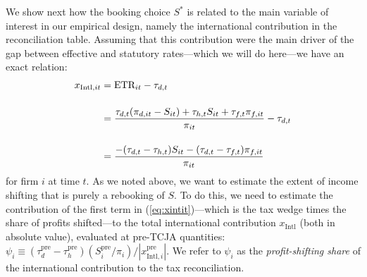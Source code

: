 \documentclass[11pt,letterpaper]{article}
\begin{document}
We show next how the booking choice $S^*$ is related to the main variable of 
interest in our empirical design, namely the international
contribution in the reconciliation table. Assuming 
that this contribution were the main driver of the
gap between effective and statutory rates---which we will do here---we have
an exact relation:
\begin{align}
  x_{\text{Intl},it} & =  \text{ETR}_{it}-\tau_{d,t}
  \nonumber\\
  \noalign{\bigskip}
                     & = \frac{\tau_{d,t}(\pi_{d,it}-S_{it})+\tau_{h,t}S_{it}+\tau_{f,t}\pi_{f,it}}{\pi_{it}}-\tau_{d,t}
  \nonumber \\
  \noalign{\bigskip}
                     & = \frac{-(\tau_{d,t}-\tau_{h,t})S_{it}-(\tau_{d,t}-\tau_{f,t})\pi_{f,it}}{\pi_{it}}
\label{eq:xintit}
\end{align}
for firm $i$ at time $t$.
As we noted above, we want to estimate the extent of income shifting that is purely a rebooking
of $S$. To do this, we need to estimate the contribution of the first term in (\ref{eq:xintit})---which
is the tax wedge times the share of profits shifted---to the total
international contribution $x_{\text{Intl}}$ (both in absolute value),
evaluated at pre-TCJA quantities:
$\psi_i\equiv(\tau_d^{\text{pre}}-\tau_h^{\text{pre}})
(S_i^{\text{pre}}/\pi_i)/|x^{\text{pre}}_{\text{Intl},i}|$. We refer to
$\psi_i$ as the \emph{profit-shifting share} of the
international contribution to the tax reconciliation.
\end{document}
